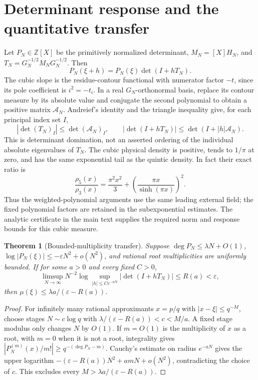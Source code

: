 \documentclass[11pt]{article}
\newtheorem{theorem}{Theorem}[section]
\theoremstyle{definition}\newtheorem{definition}[theorem]{Definition}
\theoremstyle{remark}\newtheorem{remark}[theorem]{Remark}
\begin{document}
\section{Determinant response and the quantitative transfer}
\label{zthree:transfer}

Let $P_N\in\mathbb Z[X]$ be the primitively normalized determinant,
$M_N=[X]H_N$, and $T_N=G_N^{-1/2}M_NG_N^{-1/2}$. Then
\[
 P_N(\xi+h)=P_N(\xi)\det(I+hT_N).
\]
The cubic slope is the residue-contour functional with numerator
factor $-t$, since its pole coefficient is $i^2=-t_i$.
In a real $G_N$-orthonormal basis, replace its contour measure by
its absolute value and conjugate the second polynomial to obtain
a positive matrix $\mathcal A_N$. Andreief's identity and the
triangle inequality give, for each principal index set $I$,
\[
 |\det(T_N)_I|\le\det(\mathcal A_N)_I,
 \qquad |\det(I+hT_N)|\le\det(I+|h|\mathcal A_N).
\]
This is determinant domination, not an asserted ordering of the
individual absolute eigenvalues of $T_N$.
The cubic physical density is positive, tends to $1/\pi$ at zero,
and has the same exponential tail as the quintic density. In fact
their exact ratio is
\[
 \frac{\rho_5(x)}{\rho_3(x)}
   =\frac{\pi^2x^2}{3}+\left(\frac{\pi x}{\sinh(\pi x)}\right)^2.
\]
Thus the weighted-polynomial arguments use the same leading
external field; the fixed polynomial factors are retained in the
subexponential estimates. The analytic certificate in the main text
supplies the required norm and response bounds for this cubic measure.

\begin{theorem}[Bounded-multiplicity transfer]\label{zthree:transferthm}
Suppose $\deg P_N\le\lambda N+O(1)$,
$\log|P_N(\xi)|\le-\varepsilon N^2+o(N^2)$, and rational root
multiplicities are uniformly bounded. If for some $a>0$ and every
fixed $C>0$,
\[
 \limsup_{N\to\infty}N^{-2}\log
 \sup_{|h|\le Ce^{-aN}}|\det(I+hT_N)|\le R(a)<\varepsilon,
\]
then $\mu(\xi)\le\lambda a/(\varepsilon-R(a))$.
\end{theorem}
\begin{proof}
For infinitely many rational approximants $x=p/q$ with
$|x-\xi|\le q^{-M}$, choose stages $N\sim c\log q$ with
$\lambda/(\varepsilon-R(a))<c<M/a$. A fixed stage modulus only
changes $N$ by $O(1)$. If $m=O(1)$ is the multiplicity of $x$ as
a root, with $m=0$ when it is not a root, integrality gives
$|P_N^{(m)}(x)/m!|\ge q^{-(\deg P_N-m)}$.
Cauchy's estimate on radius $e^{-aN}$ gives the upper logarithm
$-(\varepsilon-R(a))N^2+amN+o(N^2)$, contradicting the choice
of $c$. This excludes every $M>\lambda a/(\varepsilon-R(a))$.
\end{proof}
\end{document}
